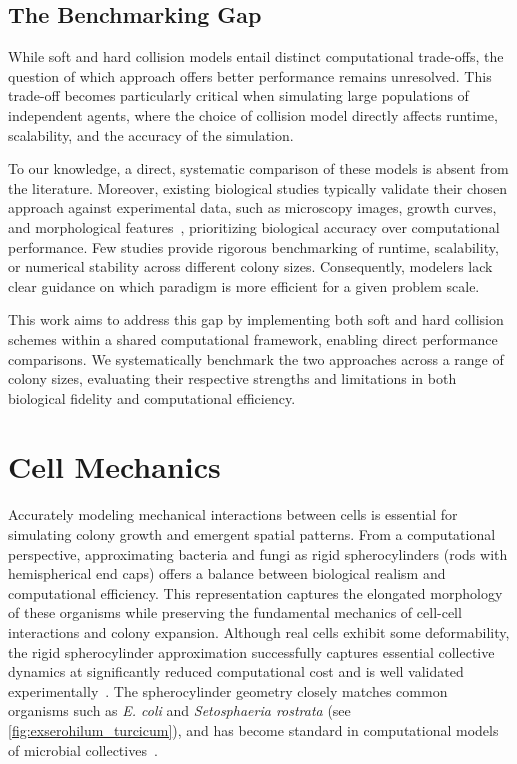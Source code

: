 \documentclass[conference]{IEEEtran}
\begin{document}
\subsection{The Benchmarking Gap}

While soft and hard collision models entail distinct computational trade-offs, the question of which approach offers better performance remains unresolved. This trade-off becomes particularly critical when simulating large populations of independent agents, where the choice of collision model directly affects runtime, scalability, and the accuracy of the simulation.

To our knowledge, a direct, systematic comparison of these models is absent from the literature. Moreover, existing biological studies typically validate their chosen approach against experimental data, such as microscopy images, growth curves, and morphological features~\cite{Rudge2012,Weady2024,Blanchard2015,Ghosh2015,You2018,Warren2019,Khan_2024,You_2021,Valdez2025,Rudge2013,Langeslay_2023}, prioritizing biological accuracy over computational performance. Few studies provide rigorous benchmarking of runtime, scalability, or numerical stability across different colony sizes. Consequently, modelers lack clear guidance on which paradigm is more efficient for a given problem scale.

This work aims to address this gap by implementing both soft and hard collision schemes within a shared computational framework, enabling direct performance comparisons. We systematically benchmark the two approaches across a range of colony sizes, evaluating their respective strengths and limitations in both biological fidelity and computational efficiency.

\section{Cell Mechanics}

Accurately modeling mechanical interactions between cells is essential for simulating colony growth and emergent spatial patterns. From a computational perspective, approximating bacteria and fungi as rigid spherocylinders (rods with hemispherical end caps) offers a balance between biological realism and computational efficiency. This representation captures the elongated morphology of these organisms while preserving the fundamental mechanics of cell-cell interactions and colony expansion. Although real cells exhibit some deformability, the rigid spherocylinder approximation successfully captures essential collective dynamics at significantly reduced computational cost and is well validated experimentally~\cite{Rudge2012,Khan_2024,Rudge2013,Langeslay_2023,Ghosh2015}. The spherocylinder geometry closely matches common organisms such as \textit{E. coli} and \textit{Setosphaeria rostrata} (see \autoref{fig:exserohilum_turcicum}), and has become standard in computational models of microbial collectives~\cite{You2018, Weady2024, Blanchard2015, Warren2019, Ghosh2015}.
\end{document}

